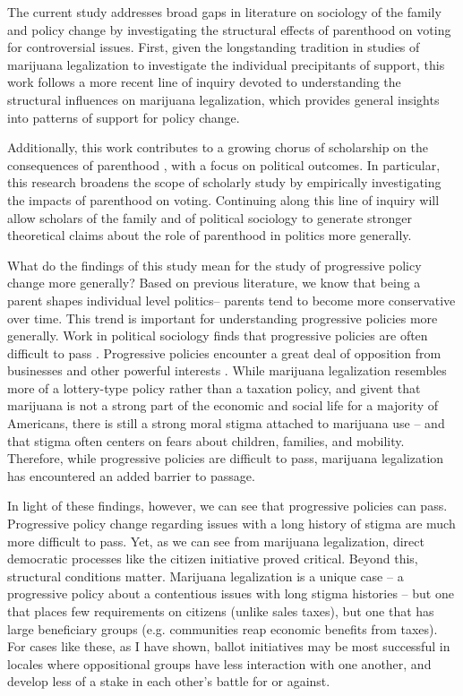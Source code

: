 The current study addresses broad gaps in literature on sociology of the family and policy change by investigating the structural effects of parenthood on voting for controversial issues. First, given the longstanding tradition in studies of marijuana legalization to investigate the individual precipitants of support, this work follows a more recent line of inquiry devoted to understanding the structural influences on marijuana legalization, which provides general insights into patterns of support for policy change. 

Additionally, this work contributes to a growing chorus of scholarship on the consequences of parenthood \citep{beisel_1997,owens_2016}, with a focus on political outcomes. In particular, this research broadens the scope of scholarly study by empirically investigating the impacts of parenthood on voting. Continuing along this line of inquiry will allow scholars of the family and of political sociology to generate stronger theoretical claims about the role of parenthood in politics more generally.

What do the findings of this study mean for the study of progressive policy change more generally? Based on previous literature, we know that being a parent shapes individual level politics-- parents tend to become more conservative over time. This trend is important for understanding progressive policies more generally. Work in political sociology finds that progressive policies are often difficult to pass \citep{amenta_and_elliott_2019}. Progressive policies encounter a great deal of opposition from businesses and other powerful interests \citep{amenta_and_halfmann_2000}. While marijuana legalization resembles more of a lottery-type policy \citep{berry_and_berry_1990} rather than a taxation policy, and givent that marijuana is not a strong part of the economic and social life for a majority of Americans, there is still a strong moral stigma attached to marijuana use -- and that stigma often centers on fears about children, families, and mobility. Therefore, while progressive policies are difficult to pass, marijuana legalization has encountered an added barrier to passage. 

In light of these findings, however, we can see that progressive policies can pass. Progressive policy change regarding issues with a long history of stigma are much more difficult to pass. Yet, as we can see from marijuana legalization, direct democratic processes like the citizen initiative proved critical. Beyond this, structural conditions matter. Marijuana legalization is a unique case -- a progressive policy about a contentious issues with long stigma histories -- but one that places few requirements on citizens (unlike sales taxes), but one that has large beneficiary groups (e.g. communities reap economic benefits from taxes). For cases like these, as I have shown, ballot initiatives may be most successful in locales where oppositional groups have less interaction with one another, and develop less of a stake in each other's battle for or against.

